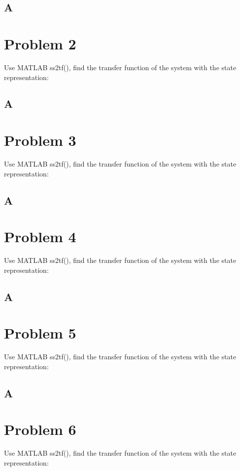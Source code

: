 \documentclass{article}
\begin{document}
\subsection*{A}
\clearpage
\section*{Problem 2}
Use MATLAB ss2tf(), find the transfer function of the system with the state representation:



\subsection*{A}
\clearpage
\section*{Problem 3}
Use MATLAB ss2tf(), find the transfer function of the system with the state representation:



\subsection*{A}
\clearpage
\section*{Problem 4}
Use MATLAB ss2tf(), find the transfer function of the system with the state representation:



\subsection*{A}
\clearpage
\section*{Problem 5}
Use MATLAB ss2tf(), find the transfer function of the system with the state representation:



\subsection*{A}
\clearpage
\section*{Problem 6}
Use MATLAB ss2tf(), find the transfer function of the system with the state representation:
\end{document}
